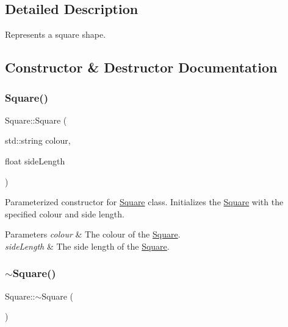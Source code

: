 \subsection{Detailed Description}
Represents a square shape. 

\subsection{Constructor \& Destructor Documentation}
\mbox{\label{class_square_ad1c9965627cb2f69fea114f1031e99cb}} 
\subsubsection{\texorpdfstring{Square()}{Square()}}
{\footnotesize\ttfamily Square\+::\+Square (\begin{DoxyParamCaption}\item[{std\+::string}]{colour,  }\item[{float}]{side\+Length }\end{DoxyParamCaption})}



Parameterized constructor for \mbox{\hyperlink{class_square}{Square}} class. Initializes the \mbox{\hyperlink{class_square}{Square}} with the specified colour and side length. 


\begin{DoxyParams}{Parameters}
{\em colour} & The colour of the \mbox{\hyperlink{class_square}{Square}}. \\
\hline
{\em side\+Length} & The side length of the \mbox{\hyperlink{class_square}{Square}}. \\
\hline
\end{DoxyParams}
\mbox{\label{class_square_a90af7ce1060cff7b717ceddb333846b8}} 
\subsubsection{\texorpdfstring{$\sim$Square()}{~Square()}}
{\footnotesize\ttfamily Square\+::$\sim$\+Square (\begin{DoxyParamCaption}{ }\end{DoxyParamCaption})}



